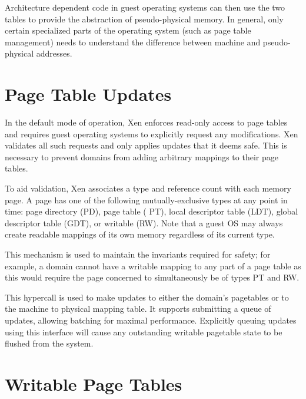 \documentclass[11pt,twoside,final,openright]{report}
\newcommand{\hypercall}[1]{\vspace{2mm}{\sf #1}}
\begin{document}
Architecture dependent code in guest operating systems can then use
the two tables to provide the abstraction of pseudo-physical memory.
In general, only certain specialized parts of the operating system
(such as page table management) needs to understand the difference
between machine and pseudo-physical addresses.


\section{Page Table Updates}

In the default mode of operation, Xen enforces read-only access to
page tables and requires guest operating systems to explicitly request
any modifications.  Xen validates all such requests and only applies
updates that it deems safe.  This is necessary to prevent domains from
adding arbitrary mappings to their page tables.

To aid validation, Xen associates a type and reference count with each
memory page. A page has one of the following mutually-exclusive types
at any point in time: page directory ({\sf PD}), page table ({\sf
  PT}), local descriptor table ({\sf LDT}), global descriptor table
({\sf GDT}), or writable ({\sf RW}). Note that a guest OS may always
create readable mappings of its own memory regardless of its current
type.

This mechanism is used to maintain the invariants required for safety;
for example, a domain cannot have a writable mapping to any part of a
page table as this would require the page concerned to simultaneously
be of types {\sf PT} and {\sf RW}.

\hypercall{mmu\_update(mmu\_update\_t *req, int count, int *success\_count, domid\_t domid)}

This hypercall is used to make updates to either the domain's
pagetables or to the machine to physical mapping table.  It supports
submitting a queue of updates, allowing batching for maximal
performance.  Explicitly queuing updates using this interface will
cause any outstanding writable pagetable state to be flushed from the
system.

\section{Writable Page Tables}
\end{document}

